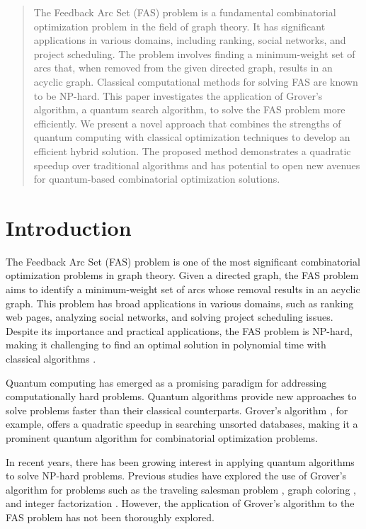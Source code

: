 \begin{abstract}
The Feedback Arc Set (FAS) problem is a fundamental combinatorial optimization problem in the field of graph theory. It has significant applications in various domains, including ranking, social networks, and project scheduling. The problem involves finding a minimum-weight set of arcs that, when removed from the given directed graph, results in an acyclic graph. Classical computational methods for solving FAS are known to be NP-hard. This paper investigates the application of Grover's algorithm, a quantum search algorithm, to solve the FAS problem more efficiently. We present a novel approach that combines the strengths of quantum computing with classical optimization techniques to develop an efficient hybrid solution. The proposed method demonstrates a quadratic speedup over traditional algorithms and has potential to open new avenues for quantum-based combinatorial optimization solutions.

\end{abstract}

\section{Introduction}

The Feedback Arc Set (FAS) problem is one of the most significant combinatorial optimization problems in graph theory. Given a directed graph, the FAS problem aims to identify a minimum-weight set of arcs whose removal results in an acyclic graph. This problem has broad applications in various domains, such as ranking web pages, analyzing social networks, and solving project scheduling issues. Despite its importance and practical applications, the FAS problem is NP-hard, making it challenging to find an optimal solution in polynomial time with classical algorithms \cite{Karp1972}.

Quantum computing has emerged as a promising paradigm for addressing computationally hard problems. Quantum algorithms provide new approaches to solve problems faster than their classical counterparts. Grover's algorithm \cite{Grover1996}, for example, offers a quadratic speedup in searching unsorted databases, making it a prominent quantum algorithm for combinatorial optimization problems.

In recent years, there has been growing interest in applying quantum algorithms to solve NP-hard problems. Previous studies have explored the use of Grover's algorithm for problems such as the traveling salesman problem \cite{Paparo2013}, graph coloring \cite{Hoyer1999}, and integer factorization \cite{Brassard1998}. However, the application of Grover's algorithm to the FAS problem has not been thoroughly explored.

